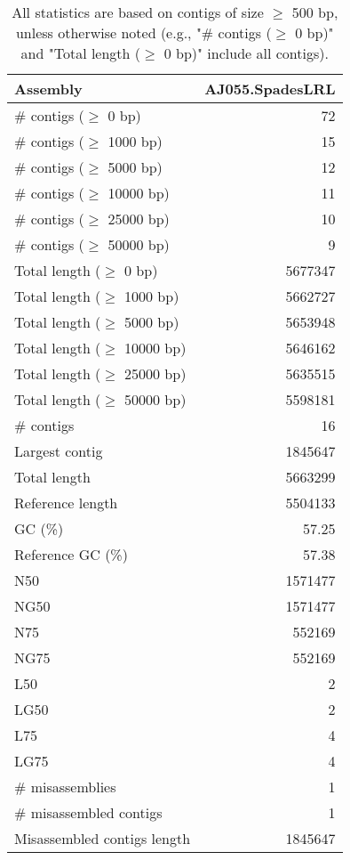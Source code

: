 \documentclass[12pt,a4paper]{article}
\begin{document}
\begin{table}[ht]
\begin{center}
\caption{All statistics are based on contigs of size $\geq$ 500 bp, unless otherwise noted (e.g., "\# contigs ($\geq$ 0 bp)" and "Total length ($\geq$ 0 bp)" include all contigs).}
\begin{tabular}{|l*{1}{|r}|}
\hline
Assembly & AJ055.SpadesLRL \\ \hline
\# contigs ($\geq$ 0 bp) & 72 \\ \hline
\# contigs ($\geq$ 1000 bp) & 15 \\ \hline
\# contigs ($\geq$ 5000 bp) & 12 \\ \hline
\# contigs ($\geq$ 10000 bp) & 11 \\ \hline
\# contigs ($\geq$ 25000 bp) & 10 \\ \hline
\# contigs ($\geq$ 50000 bp) & 9 \\ \hline
Total length ($\geq$ 0 bp) & 5677347 \\ \hline
Total length ($\geq$ 1000 bp) & 5662727 \\ \hline
Total length ($\geq$ 5000 bp) & 5653948 \\ \hline
Total length ($\geq$ 10000 bp) & 5646162 \\ \hline
Total length ($\geq$ 25000 bp) & 5635515 \\ \hline
Total length ($\geq$ 50000 bp) & 5598181 \\ \hline
\# contigs & 16 \\ \hline
Largest contig & 1845647 \\ \hline
Total length & 5663299 \\ \hline
Reference length & 5504133 \\ \hline
GC (\%) & 57.25 \\ \hline
Reference GC (\%) & 57.38 \\ \hline
N50 & 1571477 \\ \hline
NG50 & 1571477 \\ \hline
N75 & 552169 \\ \hline
NG75 & 552169 \\ \hline
L50 & 2 \\ \hline
LG50 & 2 \\ \hline
L75 & 4 \\ \hline
LG75 & 4 \\ \hline
\# misassemblies & 1 \\ \hline
\# misassembled contigs & 1 \\ \hline
Misassembled contigs length & 1845647 \\ \hline

\end{tabular}
\end{center}
\end{table}
\end{document}
